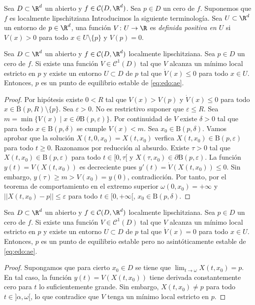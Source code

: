 Sea $D \subset \R^d$ un abierto y $f \in \mathcal{C}(D, \R^d)$. Sea $p \in D$ un cero de
$f$. Suponemos que $f$ es localmente lipschitziana Introducimos la siguiente terminología. Sea
$U \subset \R^d$ un entorno de $p \in \R^d$, una función $V \colon U \to \R$ es \emph{definida
  positiva en $U$} si $V(x) > 0$ para todo $x \in U \setminus \{p\}$ y $V(p) = 0$.

\begin{theorem} \label{thm:lyapunov:2} Sea $D \subset \R^d$ un abierto y
  $f \in \mathcal{C}(D, \R^d)$ localmente lipschitziana. Sea $p \in D$ un cero de $f$. Si existe una
  función $V \in \mathcal{C}^1(D)$ tal que $V$ alcanza un mínimo local estricto en $p$ y existe un
  entorno $U \subset D$ de $p$ tal que $\dot{V}(x) \le 0$ para todo $x \in U$. Entonces, $p$ es un
  punto de equilibrio estable de \eqref{eq:edo:ae}.
\end{theorem}
\begin{proof}
  Por hipótesis existe $0 < R$ tal que $V(x) > V(p)$ y $\dot{V}(x) \le 0$ para todo
  $x \in \overline{\mathrm{B}}(p, R) \setminus \{p\}$. Sea $\varepsilon > 0$. No es restrictivo
  suponer que $\varepsilon \le R$. Sea
  $m = \min \{V(x) \mid x \in \partial \mathrm{B}(p,\varepsilon)\}$. Por continuidad de $V$ existe
  $\delta > 0$ tal que para todo $x \in \mathrm{B}(p, \delta)$ se cumple $V(x) < m$. Sea
  $x_0 \in \mathrm{B}(p, \delta)$. Vamos aprobar que la solución $X(t,0,x_0) = X(t,x_0)$ verfica
  $X(t, x_0) \in \mathrm{B}(p,\varepsilon)$ para todo $t \ge 0$. Razonamos por reducción al
  absurdo. Existe $\tau > 0$ tal que $X(t, x_0) \in \mathrm{B}(p,\varepsilon)$ para todo
  $t \in [0, \tau[$ y $X(\tau, x_0) \in \partial \mathrm{B}(p,\varepsilon)$. La función
  $y(t) = V(X(t,x_0))$ es decreciente pues $y'(t) = \dot{V}(X(t,x_0)) \le 0$. Sin embargo,
  $y(\tau) \ge m > V(x_0) = y(0)$, contradicción. Por tanto, por el teorema de comportamiento en el
  extremo superior $\omega(0, x_0) = +\infty$ y $||X(t, x_0) - p|| \le \varepsilon$ para todo
  $t \in [0,+\infty[$, $x_0 \in \mathrm{B}(p,\delta)$.
\end{proof}

\begin{corollary}
  Sea $D \subset \R^d$ un abierto y $f \in \mathcal{C}(D, \R^d)$ localmente lipschitziana. Sea
  $p \in D$ un cero de $f$. Si existe una función $V \in \mathcal{C}^1(D)$ tal que $V$ alcanza un
  mínimo local estricto en $p$ y existe un entorno $U \subset D$ de $p$ tal que $\dot{V}(x) = 0$
  para todo $x \in U$. Entonces, $p$ es un punto de equilibrio estable pero no asintóticamente
  estable de \eqref{eq:edo:ae}.
\end{corollary}
\begin{proof}
  Supongamos que para cierto $x_0 \in D$ se tiene que $\lim_{t \to \omega} X(t,x_0) = p$. En tal
  caso, la función $y(t) = V(X(t,x_0))$ tiene derivada constantemente cero para $t$ lo
  suficientemente grande. Sin embargo, $X(t,x_0) \ne p$ para todo $t\in ]\alpha,\omega[$, lo que
  contradice que $V$ tenga un mínimo local estricto en $p$.
\end{proof}

